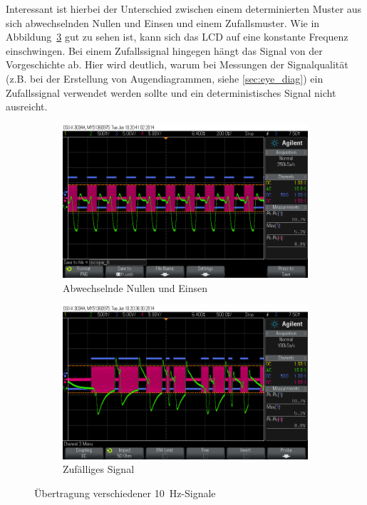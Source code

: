 \documentclass[12pt,a4paper]{article}
\begin{document}
Interessant ist hierbei der Unterschied zwischen einem determinierten Muster aus sich abwechselnden Nullen und Einsen und einem Zufallsmuster. Wie in Abbildung~\ref{fig:uart_10hz} gut zu sehen ist, kann sich das LCD auf eine konstante Frequenz einschwingen. Bei einem Zufallssignal hingegen hängt das Signal von der Vorgeschichte ab. Hier wird deutlich, warum bei Messungen der Signalqualität (z.B. bei der Erstellung von Augendiagrammen, siehe \ref{sec:eye_diag}) ein Zufallssignal verwendet werden sollte und ein deterministisches Signal nicht ausreicht.

\begin{figure}[H]
  \centering
  \begin{subfigure}[b]{0.7\textwidth}
    \includegraphics[width=\textwidth]{../measurements/20140610/10Hz_toggle/scope_6.png}
    \caption{Abwechselnde Nullen und Einsen}
    \label{fig:uart_10hz_toggle}
  \end{subfigure}
  \begin{subfigure}[b]{0.7\textwidth}
    \includegraphics[width=\textwidth]{../measurements/20140610/10Hz_random/scope_4.png}
    \caption{Zufälliges Signal}
    \label{fig:uart_10hz_random}
  \end{subfigure}
  \caption{Übertragung verschiedener \SI{10}{\hertz}-Signale}
  \label{fig:uart_10hz}
\end{figure}
\end{document}
